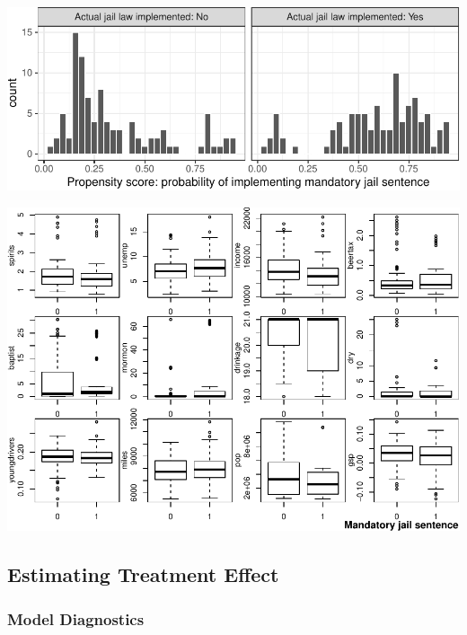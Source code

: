 \documentclass[]{article}
\let\origfigure\figure
\let\endorigfigure\endfigure
\renewenvironment{figure}[1][2] {
    \expandafter\origfigure\expandafter[H]
} {
    \endorigfigure
}
\begin{document}
\begin{figure}

{\centering \includegraphics{team6_final_project_3_files/figure-latex/three-1} 

}

\caption{Propensity score distribution across two treatment groups after matching}\label{fig:three}
\end{figure}

\begin{figure}
\centering
\includegraphics{team6_final_project_3_files/figure-latex/cov_bp-1.pdf}
\caption{(\#fig:cov\_bp)Distributions of the covariates after propensity score matching}
\end{figure}

\hypertarget{estimating-treatment-effect-1}{%
\subsection{Estimating Treatment Effect}\label{estimating-treatment-effect-1}}

\hypertarget{model-diagnostics-1}{%
\subsubsection{Model Diagnostics}\label{model-diagnostics-1}}
\end{document}
